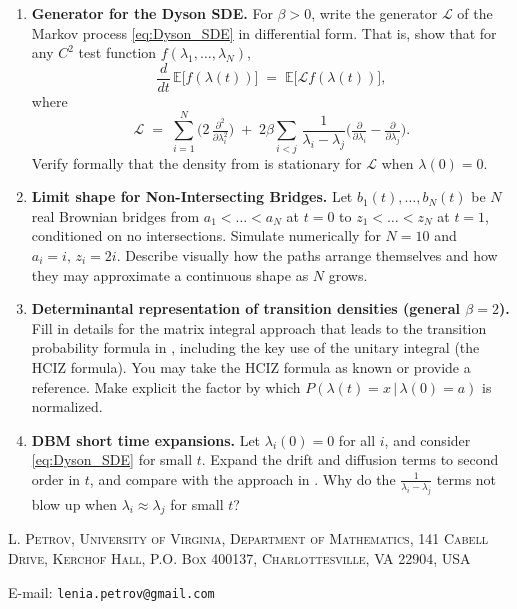 \documentclass[letterpaper,11pt,oneside,reqno]{article}
\numberwithin{equation}{section}
\theoremstyle{definition}
\begin{document}
\begin{enumerate}[1.]



\item \textbf{Generator for the Dyson SDE.} For $\beta>0$, write the generator $\mathcal{L}$ of the Markov process \eqref{eq:Dyson_SDE} in differential form. That is, show that for any $C^2$ test function $f(\lambda_1,\dots,\lambda_N)$,
\[
\frac{d}{dt}\,\mathbb{E}\bigl[f(\lambda(t))\bigr]
\;=\;\mathbb{E}\bigl[\mathcal{L}f(\lambda(t))\bigr],
\]
where
\[
\mathcal{L} \;=\; \sum_{i=1}^N \bigl(2\,\tfrac{\partial^2}{\partial \lambda_i^2}\bigr)
\;+\;2\beta\sum_{i<j}\,\frac{1}{\lambda_i-\lambda_j}\bigl(\tfrac{\partial}{\partial \lambda_i}-\tfrac{\partial}{\partial \lambda_j}\bigr).
\]
Verify formally that the density from  is stationary for $\mathcal{L}$ when $\lambda(0)=0$.



\item \textbf{Limit shape for Non-Intersecting Bridges.} Let $b_1(t),\dots,b_N(t)$ be $N$ real Brownian bridges from $a_1<\dots<a_N$ at $t=0$ to $z_1<\dots<z_N$ at $t=1$, conditioned on no intersections. Simulate numerically for $N=10$ and $a_i=i,\,z_i=2i$. Describe visually how the paths arrange themselves and how they may approximate a continuous shape as $N$ grows.

\item \textbf{Determinantal representation of transition densities (general $\beta=2$).} Fill in details for the matrix integral approach that leads to the transition probability formula in , including the key use of the unitary integral (the HCIZ formula). You may take the HCIZ formula as known or provide a reference. Make explicit the factor by which $P(\lambda(t)=x\,|\,\lambda(0)=a)$ is normalized.

\item \textbf{DBM short time expansions.} Let $\lambda_i(0)=0$ for all $i$, and consider \eqref{eq:Dyson_SDE} for small $t$. Expand the drift and diffusion terms to second order in $t$, and compare with the approach in . Why do the $\tfrac{1}{\lambda_i-\lambda_j}$ terms not blow up when $\lambda_i\approx \lambda_j$ for small $t$?
\end{enumerate}











































\medskip

\textsc{L. Petrov, University of Virginia, Department of Mathematics, 141 Cabell Drive, Kerchof Hall, P.O. Box 400137, Charlottesville, VA 22904, USA}

E-mail: \texttt{lenia.petrov@gmail.com}
\end{document}
